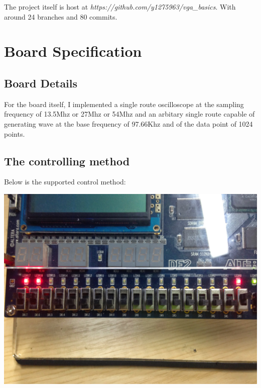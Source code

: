 \documentclass[11pt]{scrartcl}
\begin{document}
The project itself is host at \textit{https://github.com/y1275963/vga\_basics}. With around 24 branches and 80 commits.\\


\section{Board Specification}
\subsection{Board Details}
For the board itself, I implemented a single route oscilloscope at the sampling frequency of 13.5Mhz or 27Mhz or 54Mhz and an arbitary single route capable of generating wave at the base frequency of 97.66Khz and of the data point of 1024 points.%
\subsection{The controlling method}

Below is the supported control method:

\begin{center}     
\begin{minipage}[t]{\linewidth}

{
\includegraphics[scale = 0.1]{IMG_1387.JPG}
}
\end{minipage}
\medskip
\end{center}
\end{document}
